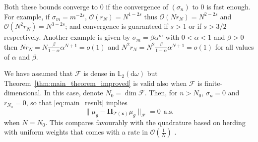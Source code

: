 \documentclass[twoside,11pt]{book}
\numberwithin{theorem}{chapter}
\numberwithin{definition}{chapter}
\numberwithin{proposition}{chapter}
\numberwithin{corollary}{chapter}
\numberwithin{example}{chapter}
\numberwithin{lemma}{chapter}
\numberwithin{assumption}{chapter}
\begin{document}
Both these bounds converge to $0$ if the convergence of $(\sigma_{n})$ to $0$ is fast enough. For example, if $\sigma_{m} = m^{-2s}$, $\mathcal{O}(r_{N}) = N^{1-2s}$ thus $\mathcal{O}(Nr_{N}) = N^{2-2s}$ and $\mathcal{O}(N^{2}r_{N}) = N^{3-2s}$; and convergence is guaranteed if $s >1$ or if $s>3/2$ respectively. Another example is given by $\sigma_{m} = \beta \alpha^{m}$ with $0 < \alpha < 1$ and $\beta >0$ then $Nr_{N} = N\frac{\beta}{1-\alpha}\alpha^{N+1}=  o(1)$ and $N^{2}r_{N} = N^{2}\frac{\beta}{1-\alpha}\alpha^{N+1}=  o(1)$ for all values of $\alpha$ and $\beta$.







We have assumed that $\mathcal{F}$ is dense in $\mathbb{L}_{2}(\mathrm{d}\omega)$ but Theorem~\ref{thm:main_theorem_improved} is valid also when $\mathcal{F}$ is finite-dimensional. In this case, denote $N_{0} = \dim \mathcal{F}$. Then, for $n > N_{0}$, $\sigma_{n} = 0$ and $r_{N_{0}} = 0$, so that \eqref{eq:main_result} implies
\begin{equation}
  \| \mu_{g} - \bm{\Pi}_{\mathcal{T}(\bm{x})}\mu_{g}\|_{\mathcal{F}}= 0 \:\: \text{a.s.}
\end{equation}
when $N= N_0$.
This compares favourably with the quadrature based on herding with uniform weights that comes with a rate in $\mathcal{O}(\frac{1}{N})$  \citep{ChWeSm10,BaLaOb12}. 


\end{document}
